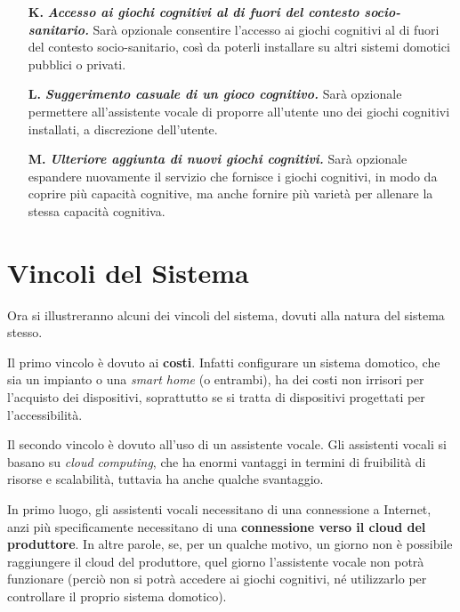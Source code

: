 \begin{enumerate}
  \item[\textbf{K.}] \textit{\textbf{Accesso ai giochi cognitivi al di fuori
            del contesto socio-sanitario.}} Sarà opzionale consentire l’accesso
        ai giochi cognitivi al di fuori del contesto socio-sanita\-rio, così
        da poterli installare su altri sistemi domotici pubblici o privati.
  \item[\textbf{L.}] \textit{\textbf{Suggerimento casuale di un gioco
            cognitivo.}} Sarà opzionale permettere all’assistente vocale di
        proporre all’utente uno dei giochi cognitivi installati, a discrezione
        dell’utente.
  \item[\textbf{M.}] \textit{\textbf{Ulteriore aggiunta di nuovi giochi
            cognitivi.}} Sarà opzionale espandere nuovamente il servizio che
        fornisce i giochi cognitivi, in modo da coprire più capacità cognitive,
        ma anche fornire più varietà per allenare la stessa capacità cognitiva.
\end{enumerate}

\section{Vincoli del Sistema}
\label{sec:Sezione2.2}

Ora si illustreranno alcuni dei vincoli del sistema, dovuti alla natura del
sistema stesso.

Il primo vincolo è dovuto ai \textbf{costi}. Infatti configurare un sistema
domotico, che sia un impianto o una \textit{smart home} (o entrambi), ha dei
costi non irrisori per l’acquisto dei dispositivi, soprattutto se si tratta di
dispositivi progettati per l’accessibilità.

Il secondo vincolo è dovuto all’uso di un assistente vocale. Gli assistenti
vocali si basano su \textit{cloud computing}, che ha enormi vantaggi in termini
di fruibilità di risorse e scalabilità, tuttavia ha anche qualche svantaggio.

In primo luogo, gli assistenti vocali necessitano di una connessione a
Internet, anzi più specificamente necessitano di una \textbf{connessione verso
il cloud del produttore}. In altre parole, se, per un qualche motivo, un giorno
non è possibile raggiungere il cloud del produttore, quel giorno l’assistente
vocale non potrà funzionare (perciò non si potrà accedere ai giochi cognitivi,
né utilizzarlo per controllare il proprio sistema domotico).

